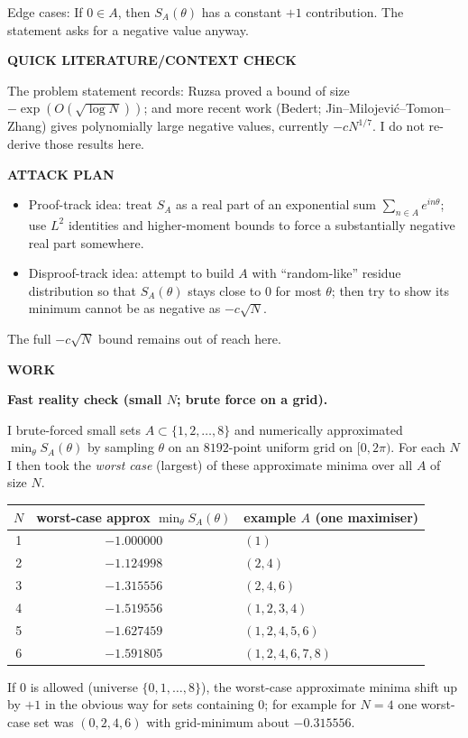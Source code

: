 Edge cases: If $0\in A$, then $S_A(\theta)$ has a constant $+1$ contribution. The statement asks for a negative value anyway.

\medskip
\noindent\textbf{QUICK LITERATURE/CONTEXT CHECK}

The problem statement records: Ruzsa proved a bound of size $-\exp(O(\sqrt{\log N}))$; and more recent work (Bedert; Jin--Milojevi\'c--Tomon--Zhang) gives polynomially large negative values, currently $-cN^{1/7}$. I do not re-derive those results here.

\medskip
\noindent\textbf{ATTACK PLAN}

\begin{itemize}
\item Proof-track idea: treat $S_A$ as a real part of an exponential sum $\sum_{n\in A} e^{in\theta}$; use $L^2$ identities and higher-moment bounds to force a substantially negative real part somewhere.
\item Disproof-track idea: attempt to build $A$ with ``random-like'' residue distribution so that $S_A(\theta)$ stays close to $0$ for most $\theta$; then try to show its minimum cannot be as negative as $-c\sqrt{N}$.
\end{itemize}
The full $-c\sqrt{N}$ bound remains out of reach here.

\medskip
\noindent\textbf{WORK}

\noindent\textbf{Fast reality check (small $N$; brute force on a grid).}

I brute-forced small sets $A\subset\{1,2,\dots,8\}$ and numerically approximated $\min_{\theta} S_A(\theta)$ by sampling $\theta$ on an $8192$-point uniform grid on $[0,2\pi)$. For each $N$ I then took the \emph{worst case} (largest) of these approximate minima over all $A$ of size $N$.

\begin{center}
\begin{tabular}{c|c|l}
$N$ & worst-case approx $\min_{\theta} S_A(\theta)$ & example $A$ (one maximiser)\\
\hline
1 & $-1.000000$ & $(1)$\\
2 & $-1.124998$ & $(2,4)$\\
3 & $-1.315556$ & $(2,4,6)$\\
4 & $-1.519556$ & $(1,2,3,4)$\\
5 & $-1.627459$ & $(1,2,4,5,6)$\\
6 & $-1.591805$ & $(1,2,4,6,7,8)$\\
\end{tabular}
\end{center}
If $0$ is allowed (universe $\{0,1,\dots,8\}$), the worst-case approximate minima shift up by $+1$ in the obvious way for sets containing $0$; for example for $N=4$ one worst-case set was $(0,2,4,6)$ with grid-minimum about $-0.315556$.


